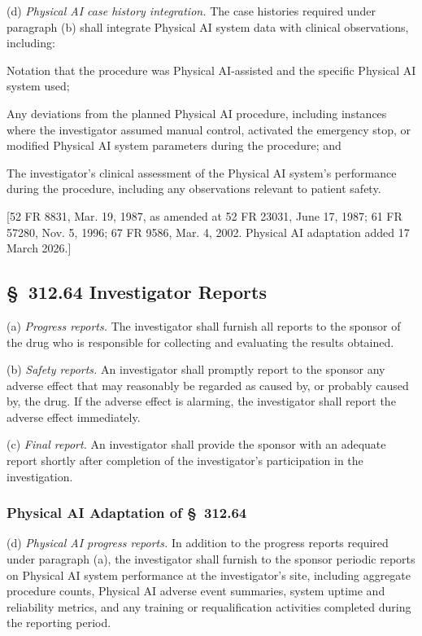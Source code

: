 (d) \textit{Physical AI case history integration.} The case histories required under paragraph (b) shall integrate Physical AI system data with clinical observations, including:

\begin{description}[leftmargin=0.8cm,style=sameline]
\item[(i)] Notation that the procedure was Physical AI-assisted and the specific Physical AI system used;
\item[(ii)] Any deviations from the planned Physical AI procedure, including instances where the investigator assumed manual control, activated the emergency stop, or modified Physical AI system parameters during the procedure; and
\item[(iii)] The investigator's clinical assessment of the Physical AI system's performance during the procedure, including any observations relevant to patient safety.
\end{description}

[52 FR 8831, Mar. 19, 1987, as amended at 52 FR 23031, June 17, 1987; 61 FR 57280, Nov. 5, 1996; 67 FR 9586, Mar. 4, 2002. Physical AI adaptation added 17 March 2026.]

\subsection{\S~312.64 Investigator Reports}

(a) \textit{Progress reports.} The investigator shall furnish all reports to the sponsor of the drug who is responsible for collecting and evaluating the results obtained.

(b) \textit{Safety reports.} An investigator shall promptly report to the sponsor any adverse effect that may reasonably be regarded as caused by, or probably caused by, the drug. If the adverse effect is alarming, the investigator shall report the adverse effect immediately.

(c) \textit{Final report.} An investigator shall provide the sponsor with an adequate report shortly after completion of the investigator's participation in the investigation.

\subsubsection{Physical AI Adaptation of \S~312.64}

(d) \textit{Physical AI progress reports.} In addition to the progress reports required under paragraph (a), the investigator shall furnish to the sponsor periodic reports on Physical AI system performance at the investigator's site, including aggregate procedure counts, Physical AI adverse event summaries, system uptime and reliability metrics, and any training or requalification activities completed during the reporting period.

